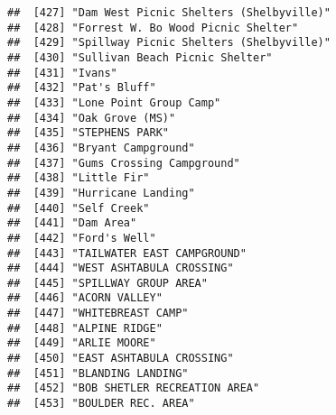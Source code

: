 \documentclass[
]{article}
\begin{document}
\begin{verbatim}
##  [427] "Dam West Picnic Shelters (Shelbyville)"                                              
##  [428] "Forrest W. Bo Wood Picnic Shelter"                                                   
##  [429] "Spillway Picnic Shelters (Shelbyville)"                                              
##  [430] "Sullivan Beach Picnic Shelter"                                                       
##  [431] "Ivans"                                                                               
##  [432] "Pat's Bluff"                                                                         
##  [433] "Lone Point Group Camp"                                                               
##  [434] "Oak Grove (MS)"                                                                      
##  [435] "STEPHENS PARK"                                                                       
##  [436] "Bryant Campground"                                                                   
##  [437] "Gums Crossing Campground"                                                            
##  [438] "Little Fir"                                                                          
##  [439] "Hurricane Landing"                                                                   
##  [440] "Self Creek"                                                                          
##  [441] "Dam Area"                                                                            
##  [442] "Ford's Well"                                                                         
##  [443] "TAILWATER EAST CAMPGROUND"                                                           
##  [444] "WEST ASHTABULA CROSSING"                                                             
##  [445] "SPILLWAY GROUP AREA"                                                                 
##  [446] "ACORN VALLEY"                                                                        
##  [447] "WHITEBREAST CAMP"                                                                    
##  [448] "ALPINE RIDGE"                                                                        
##  [449] "ARLIE MOORE"                                                                         
##  [450] "EAST ASHTABULA CROSSING"                                                             
##  [451] "BLANDING LANDING"                                                                    
##  [452] "BOB SHETLER RECREATION AREA"                                                         
##  [453] "BOULDER REC. AREA"                                                                   

\end{verbatim}
\end{document}
